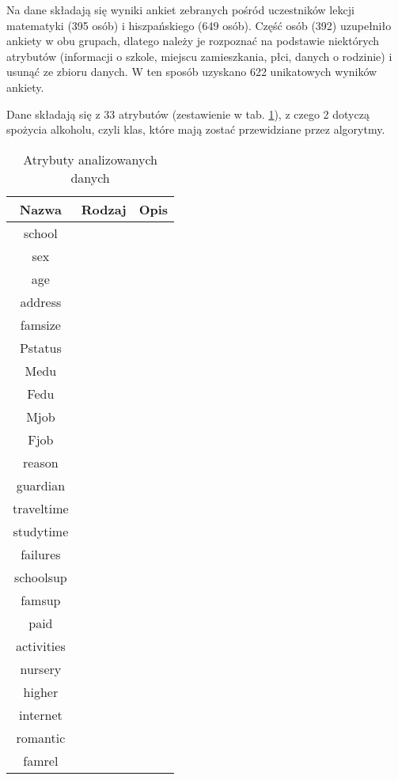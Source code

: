 Na dane składają się wyniki ankiet zebranych pośród uczestników lekcji matematyki (395 osób) i hiszpańskiego (649 osób). Część osób (392) uzupełniło ankiety w obu grupach, dlatego należy je rozpoznać na podstawie niektórych atrybutów (informacji o szkole, miejscu zamieszkania, płci, danych o rodzinie) i usunąć ze zbioru danych. W ten sposób uzyskano 622 unikatowych wyników ankiety.

Dane składają się z 33 atrybutów (zestawienie w tab. \ref{tab:attributes}), z czego 2 dotyczą spożycia alkoholu, czyli klas, które mają zostać przewidziane przez algorytmy. 
\begin{table}[h]
\centering
\caption{Atrybuty analizowanych danych}
\label{tab:attributes}
\begin{tabular}{|c|c|c|}
\hline
Nazwa & Rodzaj & Opis \\ \hline
school   &      &    \\ \hline
sex   &      &    \\ \hline
age   &      &    \\ \hline
address   &      &    \\ \hline
famsize   &      &    \\ \hline
Pstatus   &      &    \\ \hline
Medu   &      &    \\ \hline
Fedu   &      &    \\ \hline
Mjob   &      &    \\ \hline
Fjob   &      &    \\ \hline
reason   &      &    \\ \hline
guardian   &      &    \\ \hline
traveltime   &      &    \\ \hline
studytime   &      &    \\ \hline
failures   &      &    \\ \hline
schoolsup   &      &    \\ \hline
famsup   &      &    \\ \hline
paid  &      &    \\ \hline
activities   &      &    \\ \hline
nursery   &      &    \\ \hline
higher   &      &    \\ \hline
internet   &      &    \\ \hline
romantic   &      &    \\ \hline
famrel  &      &    \\ \hline

\end{tabular}
\end{table}
